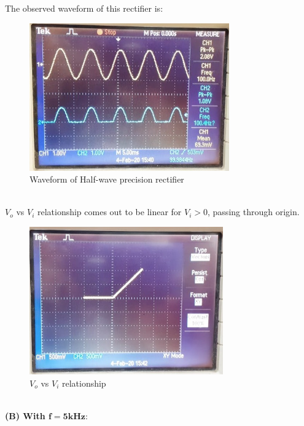 \documentclass[12pt]{article}
\begin{document}
        The observed waveform of this rectifier is: 
        \begin{figure}[H]
            \centering
            \includegraphics[width = 0.5\linewidth, height = 2.5in]{reports/lab3/half-wave-2.jpeg}
            \caption{Waveform of Half-wave precision rectifier}
        \end{figure}
        \\
        $V_o$ vs $V_i$ relationship comes out to be linear for $V_i > 0$, passing through origin.
        \begin{figure}[H]
            \centering
            \includegraphics[width = 0.6\linewidth, height = 2.5in]{reports/lab3/half-wave-xy.jpeg}
            \caption{$V_o$ vs $V_i$ relationship}
        \end{figure}
        \\
        
        \textbf{(B) With $\mathbf{f = 5kHz :}$}\\
    
\end{document}
